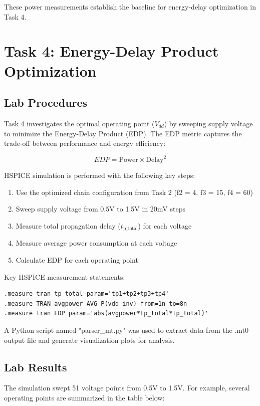 \documentclass[UTF8,12pt,a4paper]{ctexart}
\begin{document}
These power measurements establish the baseline for energy-delay optimization in Task 4.

\newpage
\section{Task 4: Energy-Delay Product Optimization}

\subsection{Lab Procedures}

Task 4 investigates the optimal operating point ($V_{dd}$) by sweeping supply voltage to minimize the Energy-Delay Product (EDP). The EDP metric captures the trade-off between performance and energy efficiency:

\[EDP = \text{Power} \times \text{Delay}^2\]

HSPICE simulation is performed with the following key steps:

\begin{enumerate}
    \item[1. ] Use the optimized chain configuration from Task 2 (f2 = 4, f3 = 15, f4 = 60)
    \item[2. ] Sweep supply voltage from 0.5V to 1.5V in 20mV steps
    \item[3. ] Measure total propagation delay ($t_{\text{p\_total}}$) for each voltage
    \item[4. ] Measure average power consumption at each voltage
    \item[5. ] Calculate EDP for each operating point
\end{enumerate}

Key HSPICE measurement statements:

\begin{lstlisting}
.measure tran tp_total param='tp1+tp2+tp3+tp4'
.measure TRAN avgpower AVG P(vdd_inv) from=1n to=8n
.measure tran EDP param='abs(avgpower*tp_total*tp_total)'
\end{lstlisting}

A Python script named "parser\_mt.py" was used to extract data from the .mt0 output file and generate visualization plots for analysis.

\subsection{Lab Results}

The simulation swept 51 voltage points from 0.5V to 1.5V. For example, several operating points are summarized in the table below:
\end{document}
